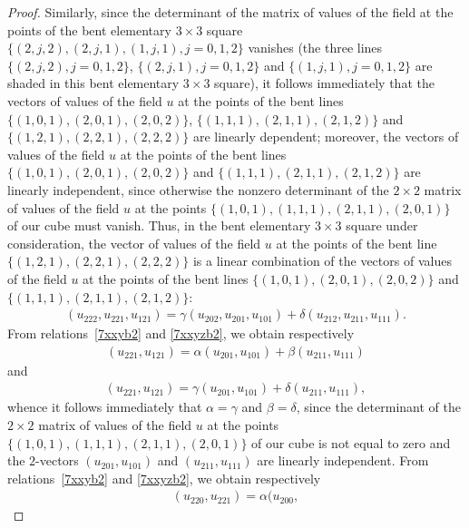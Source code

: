 \begin{proof}
Similarly, since the determinant of the matrix of values of the
f\/ield at the points of the bent elementary $3 \times 3$ square
$\{(2, j, 2), (2, j, 1), (1, j, 1), j = 0, 1, 2\}$ vanishes (the
three lines $\{(2, j, 2), j = 0, 1, 2\}$, $\{(2, j, 1), j = 0, 1,
2\}$ and $\{(1, j, 1), j = 0, 1, 2\}$ are shaded in this bent
elementary $3 \times 3$ square), it follows immediately that the
vectors of values of the f\/ield $u$ at the points of the bent lines
$\{(1, 0, 1), (2, 0, 1), (2, 0, 2)\}$, $\{(1, 1, 1), (2, 1, 1), (2,
1, 2)\}$ and $\{(1, 2, 1), (2, 2, 1), (2, 2, 2)\}$ are linearly
dependent; moreover, the vectors of values of the f\/ield $u$ at the
points of the bent lines $\{(1, 0, 1), (2, 0, 1), (2, 0, 2)\}$ and
$\{(1, 1, 1), (2, 1, 1), (2, 1, 2)\}$ are linearly independent,
since otherwise the nonzero determinant of the $2 \times 2$ matrix
of values of the f\/ield $u$ at the points $\{(1, 0, 1), (1, 1, 1),
(2, 1, 1), (2, 0, 1)\}$ of our cube must vanish. Thus, in the bent
elementary $3 \times 3$ square under consideration, the vector of
values of the f\/ield $u$ at the points of the bent line $\{(1, 2, 1),
(2, 2, 1), (2, 2, 2)\}$ is a linear combination of the vectors of
values of the f\/ield $u$ at the points of the bent lines $\{(1, 0,
1), (2, 0, 1), (2, 0, 2)\}$ and $\{(1, 1, 1), (2, 1, 1), (2, 1,
2)\}$:  \begin{gather} (u_{2 2 2}, u_{2 2 1}, u_{1 2 1}) = \gamma (u_{2 0 2},
u_{2 0 1}, u_{1 0 1}) + \delta (u_{2 1 2}, u_{2 1 1}, u_{1 1 1}).
\label{7xxyzb2} \end{gather} From relations~\eqref{7xxyb2} and
\eqref{7xxyzb2}, we obtain respectively
\begin{gather*} (u_{2 2 1}, u_{1 2 1}) =
\alpha (u_{2 0 1}, u_{1 0 1}) + \beta (u_{2 1 1}, u_{1 1 1})
\end{gather*} and
\begin{gather*}
(u_{2 2 1}, u_{1 2 1}) = \gamma (u_{2 0
1}, u_{1 0 1}) + \delta (u_{2 1 1}, u_{1 1 1}),
\end{gather*}
whence it follows immediately that $\alpha = \gamma$ and $\beta =
\delta$, since the determinant of the $2 \times 2$ matrix of values
of the f\/ield $u$ at the points $\{(1, 0, 1), (1, 1, 1), (2, 1, 1),
(2, 0, 1)\}$ of our cube is not equal to zero and the $2$-vectors
$(u_{2 0 1}, u_{1 0 1})$ and $(u_{2 1 1}, u_{1 1 1})$ are linearly
independent. From relations~\eqref{7xxyb2} and \eqref{7xxyzb2}, we
obtain respectively
\begin{gather} (u_{2 2 0}, u_{2 2 1}) = \alpha (u_{2 0 0},

\end{gather}
\end{proof}
